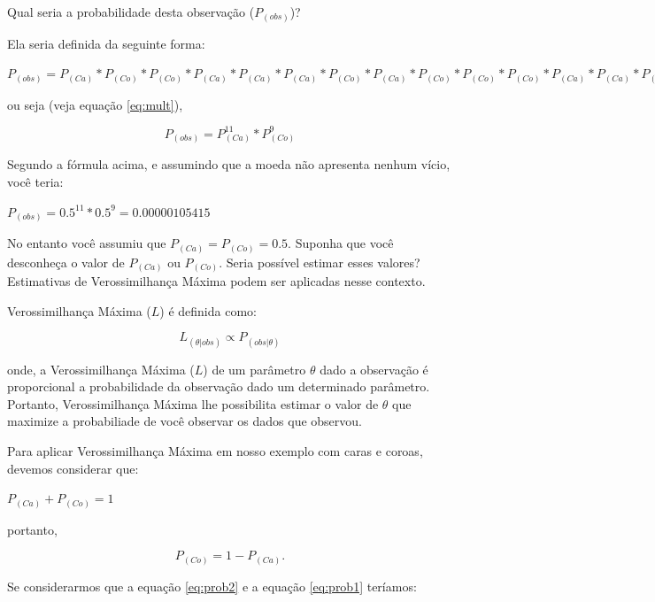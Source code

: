 \begin{refsection}
Qual seria a probabilidade desta observação ($P_{(obs)}$)?

Ela seria definida da seguinte forma:
\small
\begin{center}
$P_{(obs)} = P_{(Ca)}*P_{(Co)}*P_{(Co)}*P_{(Ca)}*P_{(Ca)}*P_{(Ca)}*P_{(Co)}*P_{(Ca)}*P_{(Co)}*P_{(Co)}*P_{(Co)}*P_{(Ca)}*P_{(Ca)}*P_{(Co)}*P_{(Ca)}*P_{(Co)}*P_{(Co)}*P_{(Ca)}*P_{(Ca)}*P_{(Ca)}$
\end{center}
\normalsize

ou seja (veja equação \ref{eq:mult}),

\begin{equation} \label{eq:prob1}
P_{(obs)} = P_{(Ca)}^{11}*P_{(Co)}^9
\end{equation}

Segundo a fórmula acima, e assumindo que a moeda não apresenta nenhum vício, você teria:

\begin{center}
$P_{(obs)} = 0.5^{11}*0.5^9 = 0.00000105415$
\end{center}

No entanto você assumiu que $P_{(Ca)} = P_{(Co)} = 0.5$. Suponha que você desconheça o valor de $P_{(Ca)}$ ou $P_{(Co)}$. Seria possível estimar esses valores? Estimativas de  Verossimilhança Máxima podem ser aplicadas nesse contexto.

Verossimilhança Máxima ($L$) é definida como:

\begin{equation} \label{eq:ml}
L_{(\theta | obs)} \propto P_{(obs | \theta)}
\end{equation}

onde, a Verossimilhança Máxima ($L$) de um parâmetro $\theta$ dado a observação é proporcional a probabilidade da observação dado um determinado parâmetro. Portanto, Verossimilhança Máxima lhe possibilita estimar o valor de $\theta$ que maximize a probabiliade de você observar os dados que observou.


Para aplicar Verossimilhança Máxima em nosso exemplo com caras e coroas, devemos considerar que:

\begin{center}
$P_{(Ca)}+P_{(Co)} = 1$
\end{center}
portanto,

\begin{equation} \label{eq:prob2}
P_{(Co)} = 1-P_{(Ca)}.
\end{equation}


Se considerarmos que a equação \eqref{eq:prob2} e a equação \eqref{eq:prob1} teríamos:



\end{refsection}
